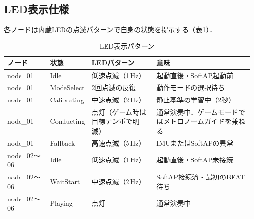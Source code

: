 \documentclass[lualatex,book,paper=a4paper,jafontsize=11.5pt,jafontscale=1.05]{jlreq}
\begin{document}
\subsection{LED表示仕様}
各ノードは内蔵LEDの点滅パターンで自身の状態を提示する（表\ref{tab:led-spec}）．
\begin{table}[H]\centering
  \caption{LED表示パターン}\label{tab:led-spec}
  \small
  \begin{tabularx}{\linewidth}{>{\raggedright\arraybackslash}p{2.4cm} >{\raggedright\arraybackslash}p{2.3cm} >{\raggedright\arraybackslash}p{2.7cm} X}
    \toprule
    ノード & 状態 & LEDパターン & 意味 \\
    \midrule
    node\_01 & Idle & 低速点滅（1\,Hz） & 起動直後・SoftAP起動前 \\
    node\_01 & ModeSelect & 2回点滅の反復 & 動作モードの選択待ち \\
    node\_01 & Calibrating & 中速点滅（2\,Hz） & 静止基準の学習中（2秒） \\
    node\_01 & Conducting & 点灯（ゲーム時は目標テンポで明滅） & 通常演奏中．ゲームモードではメトロノームガイドを兼ねる \\
    node\_01 & Fallback & 高速点滅（5\,Hz） & IMUまたはSoftAPの異常 \\
    node\_02〜06 & Idle & 低速点滅（1\,Hz） & 起動直後・SoftAP未接続 \\
    node\_02〜06 & WaitStart & 中速点滅（2\,Hz） & SoftAP接続済・最初のBEAT待ち \\
    node\_02〜06 & Playing & 点灯 & 通常演奏中 \\
    \bottomrule
  \end{tabularx}
\end{table}
\end{document}
